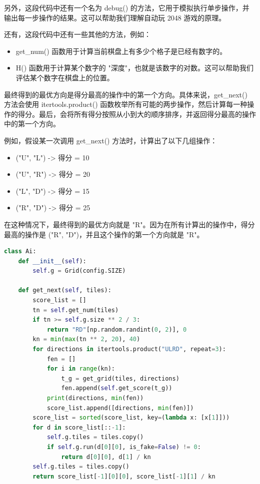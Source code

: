 \documentclass[UTF8,AutoFakeBold,AutoFakeSlant,zihao=-4]{ctexart}
\begin{document}
另外，这段代码中还有一个名为 debug() 的方法，它用于模拟执行单步操作，并输出每一步操作的结果。这可以帮助我们理解自动玩 2048 游戏的原理。

还有，这段代码中还有一些其他的方法，例如：

\begin{itemize}
  \item get\_num() 函数用于计算当前棋盘上有多少个格子是已经有数字的。
  \item H() 函数用于计算某个数字的 "深度"，也就是该数字的对数。这可以帮助我们评估某个数字在棋盘上的位置。
\end{itemize}

最终得到的最优方向是得分最高的操作中的第一个方向。具体来说，get\_next() 方法会使用 itertools.product() 函数枚举所有可能的两步操作，然后计算每一种操作的得分。最后，会将所有得分按照从小到大的顺序排序，并返回得分最高的操作中的第一个方向。

例如，假设某一次调用 get\_next() 方法时，计算出了以下几组操作：

\begin{itemize}
  \item ("U", "L") -> 得分 = 10
  \item ("U", "R") -> 得分 = 20
  \item ("L", "D") -> 得分 = 15
  \item ("R", "D") -> 得分 = 25
\end{itemize}

在这种情况下，最终得到的最优方向就是 "R"。因为在所有计算出的操作中，得分最高的操作是 ("R", "D")，并且这个操作的第一个方向就是 "R"。

\begin{lstlisting}[language=Python]
  class Ai:
    def __init__(self):
        self.g = Grid(config.SIZE)

    def get_next(self, tiles):
        score_list = []
        tn = self.get_num(tiles)
        if tn >= self.g.size ** 2 / 3:
            return "RD"[np.random.randint(0, 2)], 0
        kn = min(max(tn ** 2, 20), 40)
        for directions in itertools.product("ULRD", repeat=3):
            fen = []
            for i in range(kn):
                t_g = get_grid(tiles, directions)
                fen.append(self.get_score(t_g))
            print(directions, min(fen))
            score_list.append([directions, min(fen)])
        score_list = sorted(score_list, key=(lambda x: [x[1]]))
        for d in score_list[::-1]:
            self.g.tiles = tiles.copy()
            if self.g.run(d[0][0], is_fake=False) != 0:
                return d[0][0], d[1] / kn
        self.g.tiles = tiles.copy()
        return score_list[-1][0][0], score_list[-1][1] / kn
\end{lstlisting}
\end{document}
